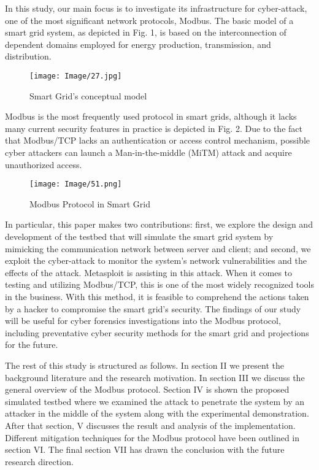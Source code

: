 \documentclass[letterpaper,10pt,conference]{IEEEtran}
\begin{document}
In this study, our main focus is to investigate its infrastructure for cyber-attack, one of the most significant network protocols, Modbus\cite{R2}. The basic model of a smart grid system, as depicted in Fig. 1, is based on the interconnection of dependent domains employed for energy production, transmission, and distribution\cite{R3}. 

\begin{figure}[h!]
\centering
\texttt{[image: Image/27.jpg]}
\caption{Smart Grid’s conceptual model \cite{R17}}
\label{Fig. 1}
\end{figure}

Modbus is the most frequently used protocol in smart grids, although it lacks many current security features in practice is depicted in Fig. 2. Due to the fact that Modbus/TCP lacks an authentication or access control mechanism, possible cyber attackers can launch a Man-in-the-middle (MiTM) attack and acquire unauthorized access. 


\begin{figure}[h!]
\centering
\texttt{[image: Image/51.png]}
\caption{Modbus Protocol in Smart Grid \cite{R26}}
\label{Fig. 1}
\end{figure}

In particular, this paper makes two contributions: first, we explore the design and development of the testbed that will simulate the smart grid system by mimicking the communication network between server and client; and second, we exploit the cyber-attack to monitor the system's network vulnerabilities and the effects of the attack\cite{R4}. Metasploit is assisting in this attack. When it comes to testing and utilizing Modbus/TCP, this is one of the most widely recognized tools in the business. With this method, it is feasible to comprehend the actions taken by a hacker to compromise the smart grid's security. The findings of our study will be useful for cyber forensics investigations into the Modbus protocol, including preventative cyber security methods for the smart grid and projections for the future.


 




The rest of this study is structured as follows. In section II we present the background literature and the research motivation. In section III we discuss the general overview of the Modbus protocol. Section IV is shown the proposed simulated testbed where we examined the attack to penetrate the system by an attacker in the middle of the system along with the experimental demonstration. After that section, V discusses the result and analysis of the implementation. Different mitigation techniques for the Modbus protocol have been outlined in section VI. The final section VII has drawn the conclusion with the future research direction.
\end{document}
